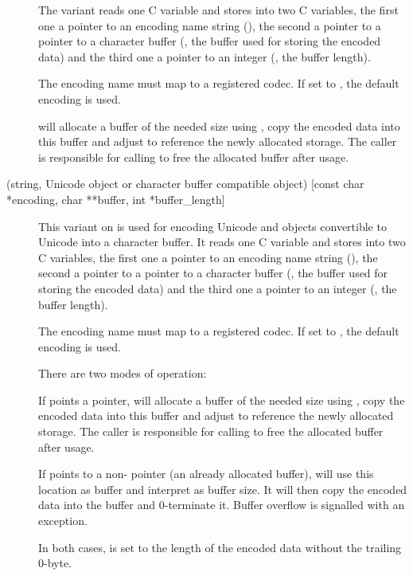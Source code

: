 \documentclass{manual}
\begin{document}
\begin{description}
The variant reads one C variable and stores into two C variables, the
first one a pointer to an encoding name string (), the
second a pointer to a pointer to a character buffer (,
the buffer used for storing the encoded data) and the third one a
pointer to an integer (, the buffer length).

The encoding name must map to a registered codec. If set to \NULL{},
the default encoding is used.

 will allocate a buffer of the needed
size using , copy the encoded data into this
buffer and adjust  to reference the newly allocated
storage. The caller is responsible for calling
 to free the allocated buffer after usage.

\item[\samp{es\#} (string, Unicode object or character buffer compatible
object) {[const char *encoding, char **buffer, int *buffer_length]}]
This variant on  is used for encoding Unicode and objects
convertible to Unicode into a character buffer. It reads one C
variable and stores into two C variables, the first one a pointer to
an encoding name string (), the second a pointer to a
pointer to a character buffer (, the buffer used for
storing the encoded data) and the third one a pointer to an integer
(, the buffer length).

The encoding name must map to a registered codec. If set to \NULL{},
the default encoding is used.

There are two modes of operation: 

If  points a \NULL{} pointer,
 will allocate a buffer of the needed
size using , copy the encoded data into this
buffer and adjust  to reference the newly allocated
storage. The caller is responsible for calling
 to free the allocated buffer after usage.

If  points to a non-\NULL{} pointer (an already allocated
buffer),  will use this location as
buffer and interpret  as buffer size. It will then
copy the encoded data into the buffer and 0-terminate it. Buffer
overflow is signalled with an exception.

In both cases,  is set to the length of the
encoded data without the trailing 0-byte.


\end{description}
\end{document}
